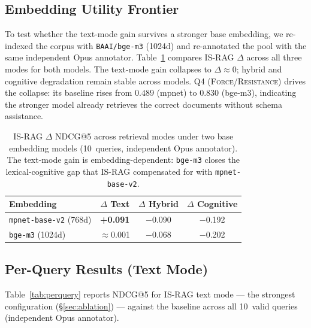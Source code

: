 \documentclass[11pt,a4paper]{article}
\begin{document}
\subsection{Embedding Utility Frontier}
\label{sec:embedding}

To test whether the text-mode gain survives a stronger base embedding,
we re-indexed the corpus with \texttt{BAAI/bge-m3} (1024d) and
re-annotated the pool with the same independent Opus annotator.
Table~\ref{tab:embedding} compares IS-RAG $\Delta$ across all three
modes for both models.
The text-mode gain collapses to $\Delta \approx 0$; hybrid and cognitive
degradation remain stable across models.
Q4 (\textsc{Force}/\textsc{Resistance}) drives the collapse: its
baseline rises from $0.489$ (mpnet) to $0.830$ (bge-m3), indicating the
stronger model already retrieves the correct documents without schema
assistance.

\begin{table}[H]
\centering
\small
\setlength{\tabcolsep}{4pt}
\begin{tabular}{lccc}
\toprule
\textbf{Embedding} & \textbf{$\Delta$ Text} & \textbf{$\Delta$ Hybrid} & \textbf{$\Delta$ Cognitive} \\
\midrule
\texttt{mpnet-base-v2} (768d) & \textbf{+0.091} & $-$0.090 & $-$0.192 \\
\texttt{bge-m3}        (1024d) & $\approx$0.001  & $-$0.068 & $-$0.202 \\
\bottomrule
\end{tabular}
\caption{IS-RAG $\Delta$ NDCG@5 across retrieval modes under two base
  embedding models (10~queries, independent Opus annotator).
  The text-mode gain is embedding-dependent: \texttt{bge-m3} closes the
  lexical-cognitive gap that IS-RAG compensated for with
  \texttt{mpnet-base-v2}.}
\label{tab:embedding}
\end{table}

\subsection{Per-Query Results (Text Mode)}

Table~\ref{tab:perquery} reports NDCG@5 for IS-RAG text mode —
the strongest configuration (\S\ref{sec:ablation}) — against the
baseline across all 10~valid queries (independent Opus annotator).
\end{document}
